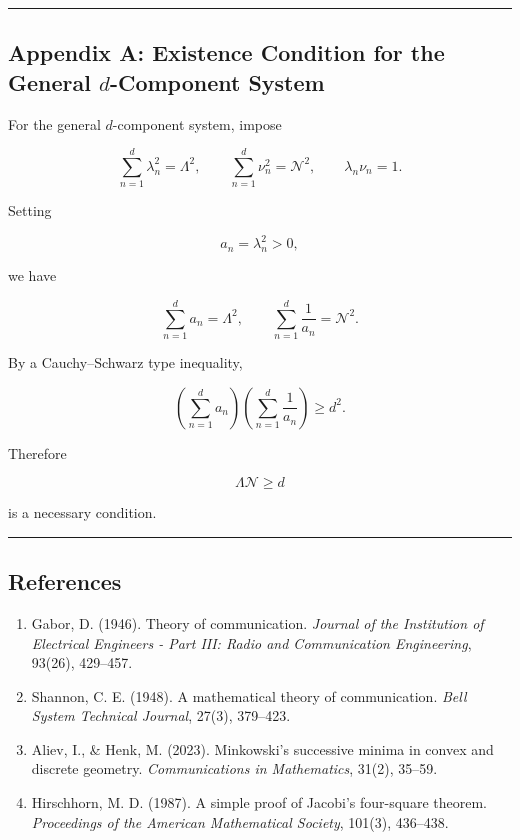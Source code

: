 \documentclass[
]{article}
\begin{document}
\begin{center}\rule{0.5\linewidth}{0.5pt}\end{center}

\subsection{\texorpdfstring{Appendix A: Existence Condition for the
General \(d\)-Component
System}{Appendix A: Existence Condition for the General d-Component System}}\label{appendix-a-existence-condition-for-the-general-d-component-system}

For the general \(d\)-component system, impose

\[
\sum_{n=1}^{d} \lambda_n^2=\Lambda^2,\qquad
\sum_{n=1}^{d} \nu_n^2=\mathcal{N}^2,\qquad
\lambda_n\nu_n=1 .
\]

Setting

\[
a_n=\lambda_n^2>0 ,
\]

we have

\[
\sum_{n=1}^{d} a_n=\Lambda^2,\qquad
\sum_{n=1}^{d} \frac{1}{a_n}=\mathcal{N}^2 .
\]

By a Cauchy--Schwarz type inequality,

\[
\left(\sum_{n=1}^{d} a_n\right)
\left(\sum_{n=1}^{d} \frac{1}{a_n}\right)\ge d^2 .
\]

Therefore

\[
\Lambda\mathcal{N}\ge d
\]

is a necessary condition.

\begin{center}\rule{0.5\linewidth}{0.5pt}\end{center}

\subsection{References}\label{references}

\begin{enumerate}
\def\labelenumi{\arabic{enumi}.}
\item
  Gabor, D. (1946). Theory of communication. \emph{Journal of the
  Institution of Electrical Engineers - Part III: Radio and
  Communication Engineering}, 93(26), 429--457.
\item
  Shannon, C. E. (1948). A mathematical theory of communication.
  \emph{Bell System Technical Journal}, 27(3), 379--423.
\item
  Aliev, I., \& Henk, M. (2023). Minkowski's successive minima in convex
  and discrete geometry. \emph{Communications in Mathematics}, 31(2),
  35--59.
\item
  Hirschhorn, M. D. (1987). A simple proof of Jacobi's four-square
  theorem. \emph{Proceedings of the American Mathematical Society},
  101(3), 436--438.
\end{enumerate}
\end{document}
